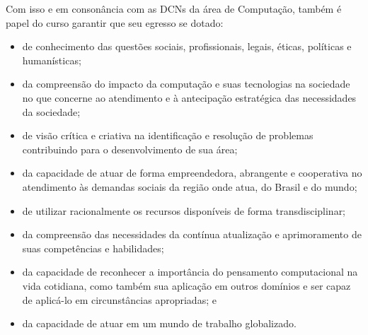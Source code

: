 Com isso e em consonância com as DCNs da área de Computação, também é papel do curso garantir que seu egresso se dotado:

\begin{itemize}
	\item de conhecimento das questões sociais, profissionais, legais, éticas, políticas e humanísticas;
	\item da compreensão do impacto da computação e suas tecnologias na sociedade no que concerne ao atendimento e à antecipação estratégica das necessidades da sociedade;
	\item de visão crítica e criativa na identificação e resolução de problemas contribuindo para o desenvolvimento de sua área;
	\item da capacidade de atuar de forma empreendedora, abrangente e cooperativa no atendimento às demandas sociais da região onde atua, do Brasil e do mundo;
	\item de utilizar racionalmente os recursos disponíveis de forma transdisciplinar;
	\item da compreensão das necessidades da contínua atualização e aprimoramento de suas competências e habilidades;
	\item da capacidade de reconhecer a importância do pensamento computacional na vida cotidiana, como também sua aplicação em outros domínios e ser capaz de aplicá-lo em circunstâncias apropriadas; e
	\item da capacidade de atuar em um mundo de trabalho globalizado.
	
\end{itemize}

